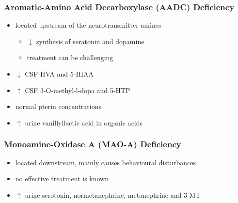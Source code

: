 \documentclass[12pt]{scrartcl}
\begin{document}
\subsubsection{Aromatic-Amino Acid Decarboxylase (AADC) Deficiency}
\label{sec:org3c334ab}
\begin{itemize}
\item located upstream of the neurotransmitter amines
\begin{itemize}
\item \(\downarrow\) synthesis of seratonin and dopamine
\item treatment can be challenging
\end{itemize}
\item \(\downarrow\) CSF HVA and 5-HIAA
\item \(\uparrow\) CSF 3-O-methyl-l-dopa and 5-HTP
\item normal pterin concentrations
\item \(\uparrow\) urine vanillyllactic acid in organic acids
\end{itemize}
\subsubsection{Monoamine-Oxidase A (MAO-A) Deficiency}
\label{sec:org86de50b}
\begin{itemize}
\item located downstream, mainly causes behavioural disturbances
\item no effective treatment is known
\item \(\uparrow\) urine serotonin, normetanephrine, metanephrine and 3-MT
\end{itemize}
\end{document}
